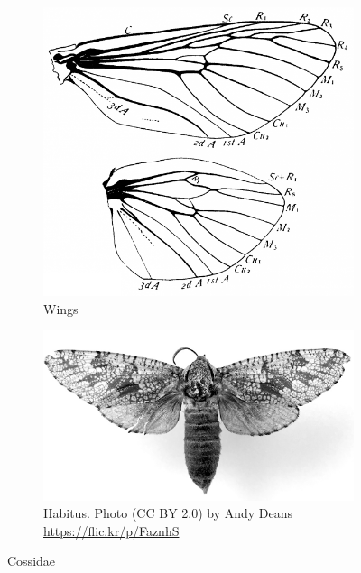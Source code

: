 \documentclass[letterpaper, 11pt]{article}
\begin{document}
\begin{figure}[ht!]
    \centering
    \begin{subfigure}[ht!]{0.35\textwidth}
        \includegraphics[width=\textwidth]{CossidWings}
        \caption{Wings \citep[Fig. 343]{comstock1918wings}}
        \label{fig:cossid1}
    \end{subfigure}
    \hfill %
    \begin{subfigure}[ht!]{0.55\textwidth}
        \includegraphics[width=\textwidth]{CossidaeHabitus}
        \caption{Habitus. Photo (CC BY 2.0) by Andy Deans \url{https://flic.kr/p/FaznhS}}
        \label{fig:cossid2}
    \end{subfigure}
    \caption{Cossidae}\label{fig:cossids}
\end{figure}
\end{document}
